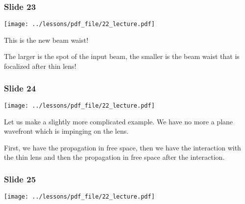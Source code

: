 \documentclass[../main/main.tex]{subfiles}
\begin{document}
\subsubsection*{Slide 23}

\begin{minipage}[]{0.5\linewidth}
\centering
\texttt{[image: ../lessons/pdf\_file/22\_lecture.pdf]}
\end{minipage}
\hspace{0.3cm}\vspace{0.3cm}
\begin{minipage}[c]{0.47\linewidth}

This is the new beam waist!

The larger is the spot of the input beam, the smaller is the beam waist that is focalized after thin lens!

\end{minipage}

\subsubsection*{Slide 24}

\begin{minipage}[]{0.5\linewidth}
\centering
\texttt{[image: ../lessons/pdf\_file/22\_lecture.pdf]}
\end{minipage}
\hspace{0.3cm}\vspace{0.3cm}
\begin{minipage}[c]{0.47\linewidth}

Let us make a slightly more complicated example. We have no more a plane wavefront which is impinging on the lens.

First, we have the propagation in free space, then we have the interaction with the thin lens and then the propagation in free space after the interaction.

\end{minipage}

\subsubsection*{Slide 25}

\begin{minipage}[]{0.5\linewidth}
\centering
\texttt{[image: ../lessons/pdf\_file/22\_lecture.pdf]}
\end{minipage}
\hspace{0.3cm}\vspace{0.3cm}
\begin{minipage}[c]{0.47\linewidth}

\end{minipage}
\end{document}
